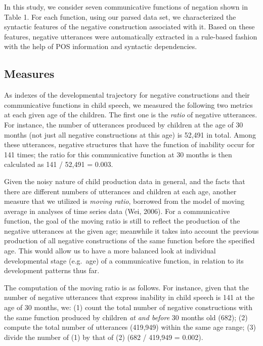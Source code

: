\documentclass[
  english,
  man,floatsintext]{apa6}
\begin{document}
In this study, we consider seven communicative functions of negation shown in Table 1. For each function, using our parsed data set, we characterized the syntactic features of the negative construction associated with it. Based on these features, negative utterances were automatically extracted in a rule-based fashion with the help of POS information and syntactic dependencies.

\hypertarget{measures}{%
\subsection{Measures}\label{measures}}

As indexes of the developmental trajectory for negative constructions and their communicative functions in child speech, we measured the following two metrics at each given age of the children. The first one is the \emph{ratio} of negative utterances. For instance, the number of utterances produced by children at the age of 30 months (not just all negative constructions at this age) is 52,491 in total. Among these utterances, negative structures that have the function of inability occur for 141 times; the ratio for this communicative function at 30 months is then calculated as 141 / 52,491 = 0.003.

Given the noisy nature of child production data in general, and the facts that there are different numbers of utterances and children at each age, another measure that we utilized is \emph{moving ratio}, borrowed from the model of moving average in analyses of time series data (Wei, 2006). For a communicative function, the goal of the moving ratio is still to reflect the production of the negative utterances at the given age; meanwhile it takes into account the previous production of all negative constructions of the same function before the specified age. This would allow us to have a more balanced look at individual developmental stage (e.g.~age) of a communicative function, in relation to its development patterns thus far.

The computation of the moving ratio is as follows. For instance, given that the number of negative utterances that express inability in child speech is 141 at the age of 30 months, we: (1) count the total number of negative constructions with the same function produced by children \emph{at and before} 30 months old (682); (2) compute the total number of utterances (419,949) within the same age range; (3) divide the number of (1) by that of (2) (682 / 419,949 = 0.002).
\end{document}
